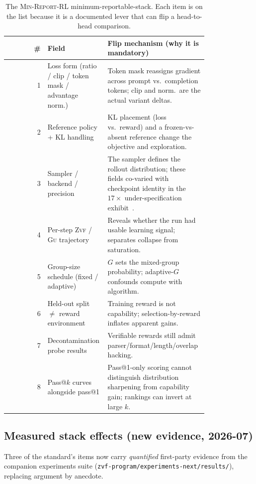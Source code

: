 \documentclass[11pt]{article}
\newcommand{\zvf}{\textsc{Zvf}}
\newcommand{\gu}{\textsc{Gu}}
\newcommand{\minreport}{\textsc{Min-Report-RL}}
\begin{document}
\begin{table}[t]
\centering
\caption{The \minreport{} minimum-reportable-stack. Each item is on the list
because it is a documented lever that can flip a head-to-head comparison.}
\label{tab:checklist}
\small
\begin{tabular}{@{}rp{0.30\linewidth}p{0.50\linewidth}@{}}
\toprule
\# & \textbf{Field} & \textbf{Flip mechanism (why it is mandatory)}\\
\midrule
1 & Loss form (ratio / clip / token mask / advantage norm.) & Token mask reassigns gradient across prompt vs.\ completion tokens; clip and norm.\ are the actual variant deltas.\\
2 & Reference policy + KL handling & KL placement (loss vs.\ reward) and a frozen-vs-absent reference change the objective and exploration.\\
3 & Sampler / backend / precision & The sampler defines the rollout distribution; these fields co-varied with checkpoint identity in the $17\times$ under-specification exhibit~\citep{zvfaudit2026}.\\
4 & Per-step \zvf{} / \gu{} trajectory & Reveals whether the run had usable learning signal; separates collapse from saturation.\\
5 & Group-size schedule (fixed / adaptive) & $G$ sets the mixed-group probability; adaptive-$G$ confounds compute with algorithm.\\
6 & Held-out split $\neq$ reward environment & Training reward is not capability; selection-by-reward inflates apparent gains.\\
7 & Decontamination probe results & Verifiable rewards still admit parser/format/length/overlap hacking.\\
8 & Pass@$k$ curves alongside pass@1 & Pass@1-only scoring cannot distinguish distribution sharpening from capability gain; rankings can invert at large $k$.\\
\bottomrule
\end{tabular}
\end{table}

\subsection{Measured stack effects (new evidence, 2026-07)}
\label{sec:measured}

Three of the standard's items now carry \emph{quantified} first-party
evidence from the companion experiments suite
(\texttt{zvf-program/experiments-next/results/}), replacing argument by
anecdote.
\end{document}
